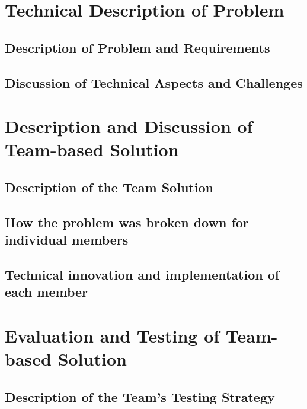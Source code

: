 \documentclass[a4paper]{report}
\begin{document}
\chapter*{Technical Description of Problem} 
\section{Description of Problem and Requirements}
\section{Discussion of Technical Aspects and Challenges}

\chapter*{Description and Discussion of Team-based Solution} 
\section{Description of the Team Solution}
\section{How the problem was broken down for individual members}
\section{Technical innovation and implementation of each member}

\chapter*{Evaluation and Testing of Team-based Solution} 
\section{Description of the Team's Testing Strategy}
\end{document}
